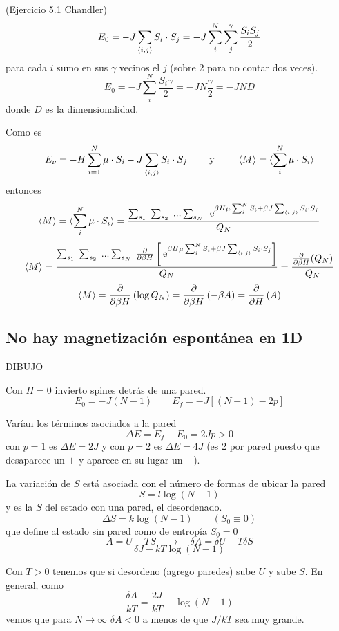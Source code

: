 \documentclass[10pt,oneside]{CBFT_book}
\begin{document}
\begin{ejemplo}{(Ejercicio 5.1 Chandler)}
\[
	E_0 = -J \sum_{\braket{i,j}} S_i \cdot S_j = -J  \sum_i^N \sum_j^\gamma \frac{S_i S_j}{2}
\]
para cada $i$ sumo en sus $\gamma$ vecinos el $j$ (sobre 2 para no contar dos veces).
\[
	E_0 = -J \sum_i^N \frac{S_i\gamma}{2} = -J N\frac{\gamma}{2} = -JND
\]
donde $D$ es la dimensionalidad.
\end{ejemplo}


Como es
\[
	E_\nu =  -H \sum_{i=1}^N \mu \cdot S_i - J \sum_{\braket{i,j}} S_i \cdot S_j \qquad
	\text{ y } \qquad \braket{M} = \braket{ \sum_i^N \mu \cdot S_i }
\]
entonces
\[
	\braket{M} = \braket{ \sum_i^N \mu \cdot S_i } = 
	\frac{ \sum_{s_1} \; \sum_{s_2} \; ... \sum_{s_N} \;
	\:\mathrm{e}^{ \beta H \mu \sum_i^N S_i + \beta J \sum_{\braket{i,j}} S_i \cdot S_j } }{Q_N}
\]
\[
	\braket{M} = \frac{ \sum_{s_1} \; \sum_{s_2} \; ... \sum_{s_N} \;
	\frac{\partial^{\hspace{-0.05em}} {}}{\partial {\beta H}^{\hspace{-0.05em}}} \left[ \:\mathrm{e}^{ \beta H \mu \sum_i^N S_i + \beta J \sum_{\braket{i,j}} S_i \cdot S_j } 
	\right]}{Q_N} = \frac{\frac{\partial^{\hspace{-0.05em}} {}}{\partial {\beta H}^{\hspace{-0.05em}}}(Q_N)}{Q_N}
\]
\[
	\braket{M} = \frac{\partial^{\hspace{-0.05em}} {}}{\partial {\beta H}^{\hspace{-0.05em}}}\left( \log Q_N \right) = \frac{\partial^{\hspace{-0.05em}} {}}{\partial {\beta H}^{\hspace{-0.05em}}}\left( -\beta A \right) =
	\frac{\partial^{\hspace{-0.05em}} {}}{\partial {H}^{\hspace{-0.05em}}}\left( A \right)
\]

\subsection{No hay magnetización espontánea en 1D}


DIBUJO 

Con $H=0$ invierto spines detrás de una pared.
\[
	E_0 = -J(N-1) \qquad E_f = -J[(N-1)-2p]
\]

Varían los términos asociados a la pared
\[
	\Delta E = E_f - E_0 = 2Jp > 0
\]
con $p=1$ es $\Delta E = 2J$ y con $p=2$ es $\Delta E = 4J$ (es 2 por pared puesto que desaparece un $+$ y aparece
en su lugar un $-$).

La variación de $S$ está asociada con el número de formas de ubicar la pared
\[
	S = l \log (N-1)
\]
y es la $S$ del estado con una pared, el desordenado.
\[
	\Delta S = k \log(N-1)	\qquad (S_0 \equiv 0)
\]
que define al estado sin pared como de entropía $S_0=0$
\[
	A = U - TS \quad \rightarrow \quad \delta A = \delta U - T \delta S
\]
\[
	\delta J - kT \log(N-1)
\]

Con $T > 0$ tenemos que si desordeno (agrego paredes) sube $U$ y sube $S$.
En general, como 
\[
	\frac{\delta A}{kT} = \frac{2J}{kT} - \log(N-1)
\]
vemos que para $N\to\infty$ $\delta A < 0$ a menos de que $J/kT$ sea muy grande.
\end{document}
